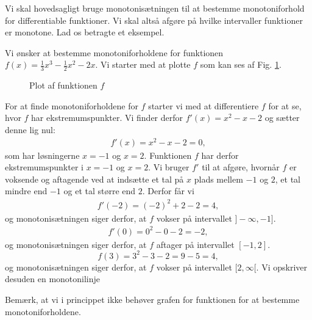Vi skal hovedsagligt bruge monotonisætningen til at bestemme monotoniforhold for differentiable funktioner. Vi skal altså afgøre på hvilke intervaller funktioner er monotone. Lad os betragte et eksempel.
\begin{exa}
Vi ønsker at bestemme monotoniforholdene for funktionen $f(x) =\frac{1}{3}x^3-\frac{1}{2}x^2-2x$. Vi starter med at plotte $f$ som kan ses af Fig. \ref{fig:monof}.

\begin{figure}[H]
\centering
{}
\caption{Plot af funktionen $f$}
\label{fig:monof}
\end{figure}
For at finde monotoniforholdene for $f$ starter vi med at differentiere $f$ for at se, hvor $f$ har ekstremumspunkter. Vi finder derfor $f'(x) = x^2-x-2$ og sætter denne lig nul:
\begin{align*}
f'(x)=x^2-x-2 = 0,
\end{align*}
som har løsningerne $x=-1$ og $x=2$. Funktionen $f$ har derfor ekstremumspunkter i $x=-1$ og $x=2$. Vi bruger $f'$ til at afgøre, hvornår $f$ er voksende og aftagende ved at indsætte et tal på $x$ plads mellem $-1$ og $2$, et tal mindre end $-1$ og et tal større end $2$. Derfor får vi
\begin{align*}
f'(-2) = (-2)^2+2-2 = 4, 
\end{align*} 
og monotonisætningen siger derfor, at $f$ vokser på intervallet $]-\infty,-1]$. 
\begin{align*}
f'(0) = 0^2-0-2 = -2,
\end{align*}
og monotonisætningen siger derfor, at $f$ aftager på intervallet $[-1,2]$.
\[ 
f(3) = 3^2-3-2 = 9-5=4,
\]
og monotonisætningen siger derfor, at $f$ vokser på intervallet $[2,\infty[.$
Vi opskriver desuden en monotonilinje
\begin{center}
\end{center}
Bemærk, at vi i princippet ikke behøver grafen for funktionen for at bestemme monotoniforholdene. 
\end{exa}
